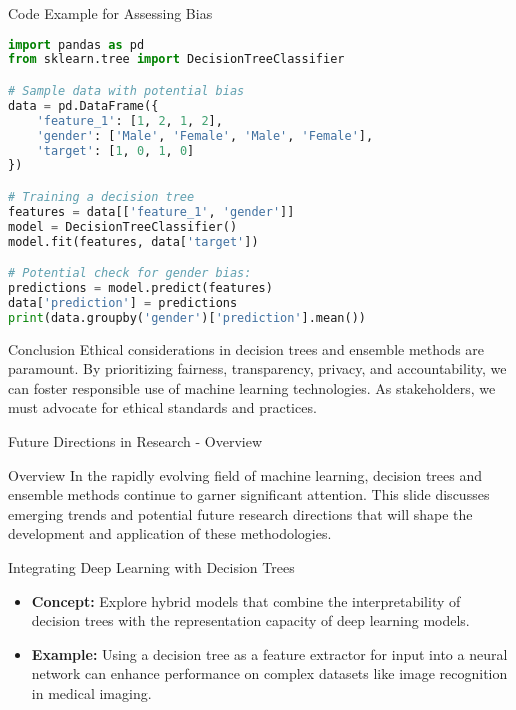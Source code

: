 \documentclass[aspectratio=169]{beamer}
\begin{document}
\begin{frame}[fragile]{Code Example for Assessing Bias}
\begin{lstlisting}[language=Python]
import pandas as pd
from sklearn.tree import DecisionTreeClassifier

# Sample data with potential bias
data = pd.DataFrame({
    'feature_1': [1, 2, 1, 2],
    'gender': ['Male', 'Female', 'Male', 'Female'],
    'target': [1, 0, 1, 0]
})

# Training a decision tree
features = data[['feature_1', 'gender']]
model = DecisionTreeClassifier()
model.fit(features, data['target'])

# Potential check for gender bias:
predictions = model.predict(features)
data['prediction'] = predictions
print(data.groupby('gender')['prediction'].mean())
\end{lstlisting}
\end{frame}

\begin{frame}[fragile]{Conclusion}
    Ethical considerations in decision trees and ensemble methods are paramount. By prioritizing fairness, transparency, privacy, and accountability, we can foster responsible use of machine learning technologies. As stakeholders, we must advocate for ethical standards and practices.
\end{frame}

\begin{frame}[fragile]{Future Directions in Research - Overview}
    \begin{block}{Overview}
        In the rapidly evolving field of machine learning, decision trees and ensemble methods continue to garner significant attention. This slide discusses emerging trends and potential future research directions that will shape the development and application of these methodologies.
    \end{block}
\end{frame}

\begin{frame}[fragile]{Integrating Deep Learning with Decision Trees}
    \begin{itemize}
        \item \textbf{Concept:} Explore hybrid models that combine the interpretability of decision trees with the representation capacity of deep learning models.
        \item \textbf{Example:} Using a decision tree as a feature extractor for input into a neural network can enhance performance on complex datasets like image recognition in medical imaging.
    \end{itemize}
\end{frame}
\end{document}
